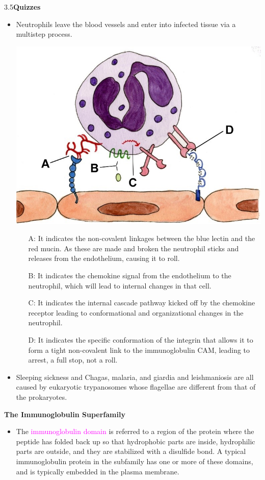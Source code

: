 \documentclass[UTF8]{book}
\begin{document}
3.5\quad \textbf{Quizzes}
\begin{itemize}
\item Neutrophils leave the blood vessels
and enter into infected tissue via a multistep process.
\begin{center}
\includegraphics[scale=0.75]{3.5.1.png}
\end{center}
\begin{itemize}
	\item[A:] It indicates the non-covalent linkages between the blue lectin and the red mucin. As these are made and broken the neutrophil sticks and releases from the
endothelium, causing it to roll.
	\item[B:] It indicates the chemokine signal from the endothelium to the
neutrophil, which will lead to internal changes in that cell.
	\item[C:] It indicates the internal cascade pathway kicked off by the chemokine receptor leading to conformational and organizational changes in the neutrophil.
	\item[D:] It indicates the specific conformation of the integrin that allows it to form a tight non-covalent link to the immunoglobulin CAM, leading to arrest, a full stop, not a roll.
\end{itemize}
\item Sleeping sickness and Chagas, malaria, and giardia and leishmaniosis are all caused by eukaryotic trypanosomes whose flagellae are different from that of the prokaryotes.
\end{itemize}
\newpage
{}\quad \textbf{The Immunoglobulin Superfamily}
\begin{itemize}
\item The \textcolor{magenta}{immunoglobulin domain} is referred to a region of the protein where the peptide has folded back up so that hydrophobic parts are inside, hydrophilic parts are outside, and they are stabilized with a disulfide bond. A typical immunoglobulin protein in the subfamily has one or more of these domains, and is typically embedded in the plasma membrane.
\end{itemize}
\end{document}
